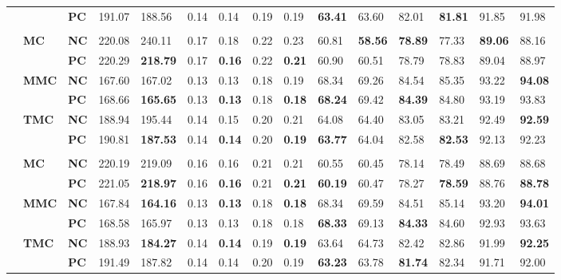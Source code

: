 \documentclass{article}
\begin{document}
\begin{landscape}
{\begin{table}[H]
\begin{tabular}{>{\bfseries}p{0.05cm} p{0.85cm} p{0.75cm} C{1.25cm} C{1.25cm} C{1.25cm} C{1.25cm} C{1.25cm} C{1.25cm} C{1.25cm} C{1.25cm} C{1.25cm} C{1.25cm} C{1.25cm} C{1.25cm}}
  &  & \bf PC & 191.07 & 188.56 &   0.14 &   0.14 &   0.19 &   0.19 & \bf 63.41 &  63.60 &  82.01 & \bf 81.81 &  91.85 &  91.98 & \\[3pt] 
     \\ 
 & \bf MC & \bf NC & 220.08 & 240.11 &   0.17 &   0.18 &   0.22 &   0.23 &  60.81 & \bf 58.56 & \bf 78.89 &  77.33 & \bf 89.06 &  88.16 & \\ 
  &  & \bf PC & 220.29 & \bf218.79 &   0.17 & \bf  0.16 &   0.22 & \bf  0.21 &  60.90 &  60.51 &  78.79 &  78.83 &  89.04 &  88.97 & \\[3pt] 
  & \bf MMC & \bf NC & 167.60 & 167.02 &   0.13 &   0.13 &   0.18 &   0.19 &  68.34 &  69.26 &  84.54 &  85.35 &  93.22 & \bf 94.08 & \\ 
  &  & \bf PC & 168.66 & \bf165.65 &   0.13 & \bf  0.13 &   0.18 & \bf  0.18 & \bf 68.24 &  69.42 & \bf 84.39 &  84.80 &  93.19 &  93.83 & \\[3pt] 
  & \bf TMC & \bf NC & 188.94 & 195.44 &   0.14 &   0.15 &   0.20 &   0.21 &  64.08 &  64.40 &  83.05 &  83.21 &  92.49 & \bf 92.59 & \\ 
  &  & \bf PC & 190.81 & \bf187.53 &   0.14 & \bf  0.14 &   0.20 & \bf  0.19 & \bf 63.77 &  64.04 &  82.58 & \bf 82.53 &  92.13 &  92.23 & \\[3pt] 
     \\ 
 & \bf MC & \bf NC & 220.19 & 219.09 &   0.16 &   0.16 &   0.21 &   0.21 &  60.55 &  60.45 &  78.14 &  78.49 &  88.69 &  88.68 & \\ 
  &  & \bf PC & 221.05 & \bf218.97 &   0.16 & \bf  0.16 &   0.21 & \bf  0.21 & \bf 60.19 &  60.47 &  78.27 & \bf 78.59 &  88.76 & \bf 88.78 & \\[3pt] 
  & \bf MMC & \bf NC & 167.84 & \bf164.16 &   0.13 & \bf  0.13 &   0.18 & \bf  0.18 &  68.34 &  69.59 &  84.51 &  85.14 &  93.20 & \bf 94.01 & \\ 
  &  & \bf PC & 168.58 & 165.97 &   0.13 &   0.13 &   0.18 &   0.18 & \bf 68.33 &  69.13 & \bf 84.33 &  84.60 &  92.93 &  93.63 & \\[3pt] 
  & \bf TMC & \bf NC & 188.93 & \bf184.27 &   0.14 & \bf  0.14 &   0.19 & \bf  0.19 &  63.64 &  64.73 &  82.42 &  82.86 &  91.99 & \bf 92.25 & \\ 
  &  & \bf PC & 191.49 & 187.82 &   0.14 &   0.14 &   0.20 &   0.19 & \bf 63.23 &  63.78 & \bf 81.74 &  82.34 &  91.71 &  92.00 & \\[3pt] 
  \hline 
  \end{tabular} 

\end{table}}
\end{landscape}
\end{document}
